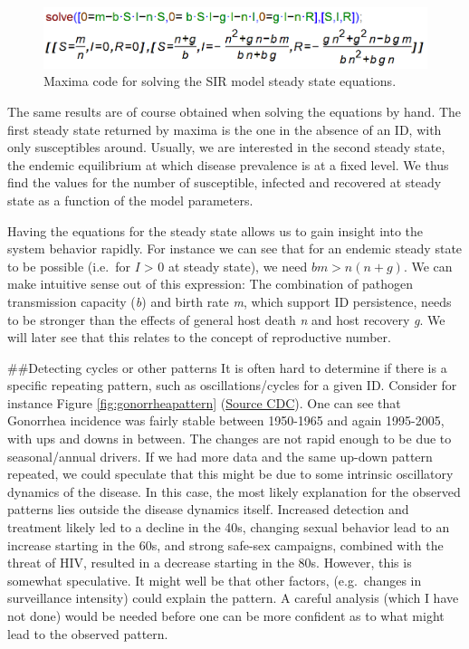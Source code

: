 \documentclass[]{book}
\theoremstyle{definition}
\theoremstyle{definition}
\theoremstyle{definition}
\theoremstyle{remark}
\begin{document}
\begin{figure}
\centering
\includegraphics{./images/SSmaxima.png}
\caption{\label{fig:SSmaxima}Maxima code for solving the SIR model steady
state equations.}
\end{figure}

The same results are of course obtained when solving the equations by
hand. The first steady state returned by maxima is the one in the
absence of an ID, with only susceptibles around. Usually, we are
interested in the second steady state, the endemic equilibrium at which
disease prevalence is at a fixed level. We thus find the values for the
number of susceptible, infected and recovered at steady state as a
function of the model parameters.

Having the equations for the steady state allows us to gain insight into
the system behavior rapidly. For instance we can see that for an endemic
steady state to be possible (i.e.~for \emph{I} \textgreater{} 0 at
steady state), we need \(b m > n (n+ g)\). We can make intuitive sense
out of this expression: The combination of pathogen transmission
capacity (\emph{b}) and birth rate \emph{m}, which support ID
persistence, needs to be stronger than the effects of general host death
\emph{n} and host recovery \emph{g}. We will later see that this relates
to the concept of reproductive number.

\#\#Detecting cycles or other patterns It is often hard to determine if
there is a specific repeating pattern, such as oscillations/cycles for a
given ID. Consider for instance Figure \ref{fig:gonorrheapattern}
(\href{http://www.cdc.gov/STD/stats06/images/trends-img-2.gif}{Source
CDC}). One can see that Gonorrhea incidence was fairly stable between
1950-1965 and again 1995-2005, with ups and downs in between. The
changes are not rapid enough to be due to seasonal/annual drivers. If we
had more data and the same up-down pattern repeated, we could speculate
that this might be due to some intrinsic oscillatory dynamics of the
disease. In this case, the most likely explanation for the observed
patterns lies outside the disease dynamics itself. Increased detection
and treatment likely led to a decline in the 40s, changing sexual
behavior lead to an increase starting in the 60s, and strong safe-sex
campaigns, combined with the threat of HIV, resulted in a decrease
starting in the 80s. However, this is somewhat speculative. It might
well be that other factors, (e.g.~changes in surveillance intensity)
could explain the pattern. A careful analysis (which I have not done)
would be needed before one can be more confident as to what might lead
to the observed pattern.
\end{document}
